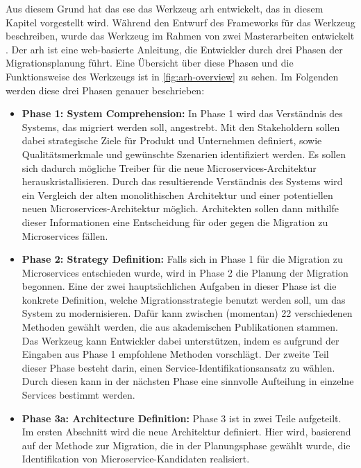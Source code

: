 Aus diesem Grund hat das \gls{ese} das Werkzeug \gls{arh} \cite{arh-github} entwickelt, das in diesem Kapitel vorgestellt wird.
Während  den Entwurf des Frameworks für das Werkzeug beschreiben, wurde das Werkzeug im Rahmen von zwei Masterarbeiten entwickelt \cite{master-daniel-koch}\cite{master-daniel-koch2}\cite{master-tobias-haller}.
Der \gls{arh} ist eine web-basierte Anleitung, die Entwickler durch drei Phasen der Migrationsplanung führt.
Eine Übersicht über diese Phasen und die Funktionsweise des Werkzeugs ist in \cref{fig:arh-overview} zu sehen.
Im Folgenden werden diese drei Phasen genauer beschrieben: 

\begin{itemize}
	\item \textbf{Phase 1: System Comprehension:}
	In Phase 1 wird das Verständnis des Systems, das migriert werden soll, angestrebt. 
	Mit den Stakeholdern sollen dabei strategische Ziele für Produkt und Unternehmen definiert, sowie Qualitätsmerkmale und gewünschte Szenarien identifiziert werden.
	Es sollen sich dadurch mögliche Treiber für die neue Microservices-Architektur herauskristallisieren.
	Durch das resultierende Verständnis des Systems wird ein Vergleich der alten monolithischen Architektur und einer potentiellen neuen Microservices-Architektur möglich.
	Architekten sollen dann mithilfe dieser Informationen eine Entscheidung für oder gegen die Migration zu Microservices fällen.
	\item \textbf{Phase 2: Strategy Definition:}
	Falls sich in Phase 1 für die Migration zu Microservices entschieden wurde, wird in Phase 2 die Planung der Migration begonnen.
	Eine der zwei hauptsächlichen Aufgaben in dieser Phase ist die konkrete Definition, welche Migrationsstrategie benutzt werden soll, um das System zu modernisieren.
	Dafür kann zwischen (momentan) 22 verschiedenen Methoden gewählt werden, die aus akademischen Publikationen stammen.
	Das Werkzeug kann Entwickler dabei unterstützen, indem es aufgrund der Eingaben aus Phase 1 empfohlene Methoden vorschlägt.
	Der zweite Teil dieser Phase besteht darin, einen Service-Identifikationsansatz zu wählen.
	Durch diesen kann in der nächsten Phase eine sinnvolle Aufteilung in einzelne Services bestimmt werden.
	\item \textbf{Phase 3a: Architecture Definition:}
	Phase 3 ist in zwei Teile aufgeteilt. 
	Im ersten Abschnitt wird die neue Architektur definiert. 
	Hier wird, basierend auf der Methode zur Migration, die in der Planungsphase gewählt wurde, die Identifikation von Microservice-Kandidaten realisiert.

\end{itemize}
